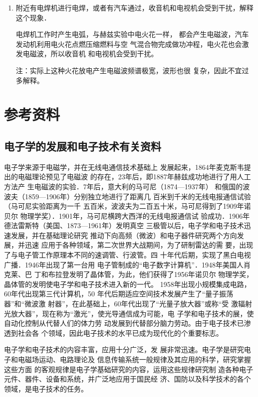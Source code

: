 \begin{enumerate}
	\item 附近有电焊机进行电焊，或者有汽车通过，收音机和电视机会受到干扰，解释这个现象．

    \begin{solution}
    电焊机工作时产生电弧，与赫兹实验中电火花一样，
都会产生电磁波，汽车发动机利用电火花点燃压缩燃料与空
气混合物完成做功冲程，电火花也会激发电磁波，所以收音机
和电视机会受到干扰。

注：实际上这种火花放电产生电磁波频谱极宽，波形也很
复杂，因此不宜过多解释。
    \end{solution}
\end{enumerate}


\section{参考资料}
\subsection{电子学的发展和电子技术有关资料}

电子学来源于电磁学，并在无线电通信技术基础上
发展起来，1864年麦克斯韦提出的电磁理论预见了电磁波
的存在，23年后，即1887年赫兹成功地进行了用人工方法产
生电磁波的实验．7年后，意大利的马可尼（1874—1937年）
和俄国的波波夫（1859—1906年）分别独立地进行了距离几
百米到千米的无线电报通信试验（马可尼实验距离为一千
五百米，波波夫为二百五十米，马可尼得到了1909年诺贝尔
物理学奖）．1901年，马可尼横跨大西洋的无线电报通信试
验成功．1906年德法雷斯特（美国、1873—1961年）发明真空
三极管以后，电子学和电子技术迅速发展，并在基础理论研究
推动下向高频（微波）和电子器件研究两个方向发展，并迅速
应用于各种领域，第二次世界大战期间，为了研制雷达的需
要，出现了与电子管工作原理本不同的速调管、行波管。四
十年代后期，实现了黑白电视广播．1946年出现了第一台用
电子管制成的“电子数字计算机”．1948年美国人肖克莱、巴
丁和布拉登发明了晶体管，为此，他们获得了1956年诺贝尔
物理学奖，晶体管的发明使电子学和电子技术进入新的一代。
1958年出现小规模集成电路，60年代出现第三代计算机，50
年代后期适应空间技术发展产生了“量子振荡器”和“微波激
射器”，在此基础上，60年代出现了“光量子放大器”或称“受
激辐射光放大器”，现在称为“激光”，使光导通信成为可能，电
子学和电子技术的展，使自动化控制从代替人们的体力劳
动发展到代替部分脑力劳动。由于电子技术已渗透到社会各
个领域，因此电子技术的水平已成为现代化的个重要标志。

电子学和电子技术的内容丰富，应用十分广泛，发
展非常迅速。电子学是研究电子和电磁场运动、电路理论及
信息传输系统一般规律及其应用的科学，研究掌握这些方面
的客观规律是电子学基础研究的内容，运用这些规律研究制
造各种电子元件、器件、设备和系统，并广泛地应用于国民经
济、国防以及科学技术的各个领域，是电子技术的任务。

